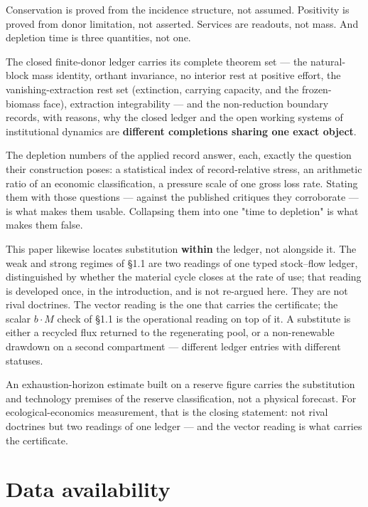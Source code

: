 \documentclass[11pt]{article}
\begin{document}
Conservation is proved from the incidence structure, not assumed. Positivity is proved from donor limitation, not asserted. Services are readouts, not mass. And depletion time is three quantities, not one.

The closed finite-donor ledger carries its complete theorem set --- the natural-block mass identity, orthant invariance, no interior rest at positive effort, the vanishing-extraction rest set (extinction, carrying capacity, and the frozen-biomass face), extraction integrability --- and the non-reduction boundary records, with reasons, why the closed ledger and the open working systems of institutional dynamics are \textbf{different completions sharing one exact object}.

The depletion numbers of the applied record answer, each, exactly the question their construction poses: a statistical index of record-relative stress, an arithmetic ratio of an economic classification, a pressure scale of one gross loss rate. Stating them with those questions --- against the published critiques they corroborate --- is what makes them usable. Collapsing them into one "time to depletion" is what makes them false.

This paper likewise locates substitution \textbf{within} the ledger, not alongside it. The weak and strong regimes of \S1.1 are two readings of one typed stock--flow ledger, distinguished by whether the material cycle closes at the rate of use; that reading is developed once, in the introduction, and is not re-argued here. They are not rival doctrines. The vector reading is the one that carries the certificate; the scalar \(b\cdot M\) check of \S1.1 is the operational reading on top of it. A substitute is either a recycled flux returned to the regenerating pool, or a non-renewable drawdown on a second compartment --- different ledger entries with different statuses.

An exhaustion-horizon estimate built on a reserve figure carries the substitution and technology premises of the reserve classification, not a physical forecast. For ecological-economics measurement, that is the closing statement: not rival doctrines but two readings of one ledger --- and the vector reading is what carries the certificate.

\vspace{0.8em}

\section*{Data availability}\label{data-availability}
\end{document}
